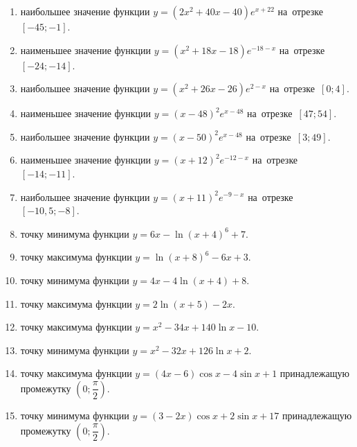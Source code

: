 \documentclass[a4paper,10pt]{article}
\begin{document}
\begin{enumerate}
\item {} наибольшее значение функции $y=\left(2x^2 +40x -40\right)e^{x+22}$ на~отрезке~$\left[-45;-1\right]$.

\item {} наименьшее значение функции $y=\left(x^2 +18x -18\right)e^{-18-x}$ на~отрезке~$\left[-24;-14\right]$.

\item {} наибольшее значение функции $y=\left(x^2 +26x -26\right)e^{2-x}$ на~отрезке~$\left[0;4\right]$.

\item {} наименьшее значение функции $y=\left(x-48\right)^2e^{x-48}$ на~отрезке~$\left[47;54\right]$.

\item {} наибольшее значение функции $y=\left(x-50\right)^2e^{x-48}$ на~отрезке~$\left[3;49\right]$.

\item {} наименьшее значение функции $y=\left(x+12\right)^2e^{-12-x}$ на~отрезке~$\left[-14;-11\right]$.

\item {} наибольшее значение функции $y=\left(x+11\right)^2e^{-9-x}$ на~отрезке~$\left[-10,5;-8\right]$.

\item {} точку минимума функции $y=6x-\ln\left(x+4\right)^{6}+7$.

\item {} точку максимума функции $y=\ln\left(x+8\right)^{6}-6x+3$.

\item {} точку минимума функции $y=4x-4\ln\left(x+4\right)+8$.

\item {} точку максимума функции $y=2\ln\left(x+5\right)-2x$.

\item {} точку максимума функции $y=x^2-34x+140\ln x -10$.

\item {} точку минимума функции $y=x^2-32x+126\ln x +2$.

\item {} точку максимума функции $y=\left(4x-6\right)\cos x -4\sin x+1$
принадлежащую промежутку $\left(0;\dfrac{\pi}{2}\right)$.

\item {} точку минимума функции $y=\left(3-2x\right)\cos x +2\sin x+17$
принадлежащую промежутку $\left(0;\dfrac{\pi}{2}\right)$.


\end{enumerate}
\end{document}
